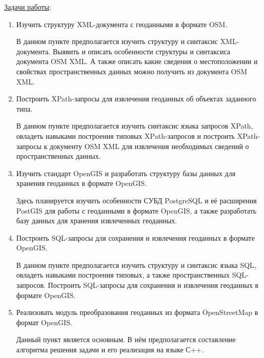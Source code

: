 \documentclass[12pt,a4paper,oneside]{article} %
\begin{document}
\underline{Задачи работы}:
\begin{enumerate}
\item Изучить структуру XML-документа с геоданными в формате OSM.

  В данном пункте предполагается изучить структуру и синтаксис \linebreak
  XML-документа. Выявить и описать особенности структуры и \linebreak
  синтаксиса документа OSM XML. А также описать какие \linebreak
  сведения о местоположении и свойствах пространственных данных \linebreak
  можно получить из документа OSM XML.
\item Построить XPath-запросы для извлечения геоданных об объектах \linebreak
заданного типа.

  В данном пункте предполагается изучить синтаксис языка запросов \linebreak
  XPath, овладеть навыками построения типовых XPath-запросов и \linebreak
  построить XPath-запросы к документу OSM XML для извлечения \linebreak
  необходимых сведений о пространственных данных.
\item Изучить стандарт OpenGIS и разработать структуру базы \linebreak
данных для хранения геоданных в формате OpenGIS.

  Здесь планируется изучить особенности СУБД PostgreSQL и её \linebreak
  расширения PostGIS для работы с геоданными в формате OpenGIS, \linebreak
  а также разработать базу данных для хранения извлеченных \linebreak
  геоданных.
\item Построить SQL-запросы для сохранения и извлечения геоданных \linebreak
в формате OpenGIS.

  В данном пункте предполагается изучить структуру и синтаксис \linebreak
  языка SQL, овладеть навыками построения типовых, а также \linebreak
  пространственных SQL-запросов. Построить SQL-запросы для \linebreak
  сохранения и извлечения геоданных в формате OpenGIS.
\item Реализовать модуль преобразования геоданных из формата \linebreak
OpenStreetMap в формат OpenGIS.

  Данный пункт является основным. В нём предполагается составление \linebreak
  алгоритма решения задачи и его реализация на языке С++.
\end{enumerate}
\end{document}
